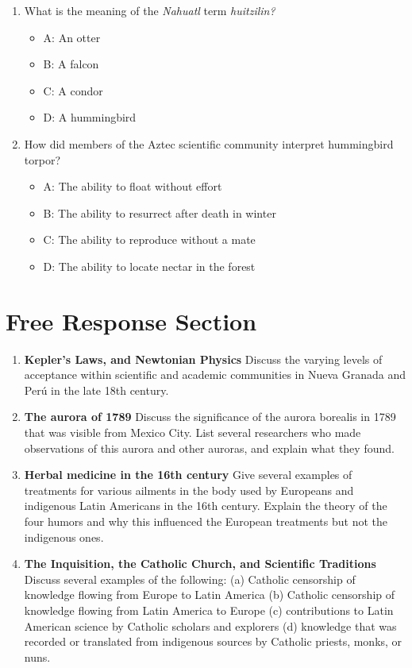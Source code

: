 \documentclass[10pt]{article}
\begin{document}
\begin{enumerate}
\begin{itemize}
\end{itemize}
\item What is the meaning of the \textit{Nahuatl} term \textit{huitzilin?}
\begin{itemize}
\item A: An otter
\item B: A falcon
\item C: A condor
\item D: A hummingbird
\end{itemize}
\item How did members of the Aztec scientific community interpret hummingbird torpor?
\begin{itemize}
\item A: The ability to float without effort
\item B: The ability to resurrect after death in winter
\item C: The ability to reproduce without a mate
\item D: The ability to locate nectar in the forest
\end{itemize}
\end{enumerate}

\section{Free Response Section}

\begin{enumerate}
\item \textbf{Kepler's Laws, and Newtonian Physics} Discuss the varying levels of acceptance within scientific and academic communities in Nueva Granada and Per\'{u} in the late 18th century. \\ \vspace{3cm}
\item \textbf{The aurora of 1789} Discuss the significance of the aurora borealis in 1789 that was visible from Mexico City.  List several researchers who made observations of this aurora and other auroras, and explain what they found. \\ \vspace{3cm}
\item \textbf{Herbal medicine in the 16th century} Give several examples of treatments for various ailments in the body used by Europeans and indigenous Latin Americans in the 16th century.  Explain the theory of the four humors and why this influenced the European treatments but not the indigenous ones. \\ \vspace{3cm}
\item \textbf{The Inquisition, the Catholic Church, and Scientific Traditions} Discuss several examples of the following: (a) Catholic censorship of knowledge flowing from Europe to Latin America (b) Catholic censorship of knowledge flowing from Latin America to Europe (c) contributions to Latin American science by Catholic scholars and explorers (d) knowledge that was recorded or translated from indigenous sources by Catholic priests, monks, or nuns.
\end{enumerate}
\end{document}
